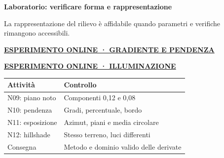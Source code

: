 \documentclass[12pt,aspectratio=1610]{beamer}
\newcommand{\PLab}[2]{\par{\color{Classical}\bfseries\fontsize{9}{11}\selectfont
\href{#1}{\MakeUppercase{#2}}}\par\vspace{1.8mm}}
\begin{document}
\begin{frame}[plain]\hypertarget{slide76}{}
\begin{lrbox}{\TitleBox}
\begin{minipage}[t]{17.7cm}\raggedright\color{Ink}\fontsize{11.3}{14.8}\selectfont
\color{Navy}\bfseries\fontsize{20.6}{24.5}\selectfont Laboratorio: verificare forma e rappresentazione
\end{minipage}\end{lrbox}

\begin{lrbox}{\RecallBox}
\begin{minipage}[t]{14.3cm}\raggedright\color{Ink}\fontsize{11.3}{14.8}\selectfont
\fontsize{10.3}{13.8}\selectfont La rappresentazione del rilievo è affidabile quando parametri e verifiche rimangono accessibili.
\end{minipage}\end{lrbox}

\begin{lrbox}{\PilotLeftBox}
\begin{minipage}[t]{10.05cm}\raggedright\color{Ink}\fontsize{11.3}{14.8}\selectfont
\PLab{https://marzione00.github.io/Lab_Geo/\#laboratorio/m12-pendenza}{Esperimento online · gradiente e pendenza}
\PLab{https://marzione00.github.io/Lab_Geo/\#laboratorio/m12-hillshade}{Esperimento online · illuminazione}
{\fontsize{10.2}{13.1}\selectfont\renewcommand{\arraystretch}{1.45}\begin{tabular}{@{}p{4.1cm}p{4.9cm}@{}}\toprule
\textbf{Attività} & \textbf{Controllo}\\\midrule
N09: piano noto & Componenti 0,12 e 0,08\\
N10: pendenza & Gradi, percentuale, bordo\\
N11: esposizione & Azimut, piani e media circolare\\
N12: hillshade & Stesso terreno, luci differenti\\
Consegna & Metodo e dominio valido delle derivate\\
\bottomrule\end{tabular}}

\end{minipage}\end{lrbox}


\end{frame}
\end{document}
